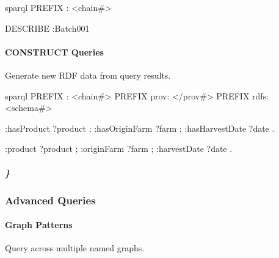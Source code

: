 \documentclass[letterpaper,10pt,english]{sphinxmanual}
\begin{document}
\sphinxAtStartPar
{}
{\color{red}\bfseries{}\textasciigrave{}\textasciigrave{}}{\color{red}\bfseries{}\textasciigrave{}}sparql
PREFIX : \textless{}\sphinxhyphen{}chain\#\textgreater{}

\sphinxAtStartPar
DESCRIBE :Batch001
{\color{red}\bfseries{}\textasciigrave{}\textasciigrave{}}{\color{red}\bfseries{}\textasciigrave{}}


\paragraph{CONSTRUCT Queries}
\label{\detokenize{api/sparql-api:construct-queries}}
\sphinxAtStartPar
Generate new RDF data from query results.

\sphinxAtStartPar
{}
{\color{red}\bfseries{}\textasciigrave{}\textasciigrave{}}{\color{red}\bfseries{}\textasciigrave{}}sparql
PREFIX : \textless{}\sphinxhyphen{}chain\#\textgreater{}
PREFIX prov: \textless{}/prov\#\textgreater{}
PREFIX rdfs: \textless{}\sphinxhyphen{}schema\#\textgreater{}
\begin{description}
\begin{description}
\sphinxAtStartPar
:hasProduct ?product ;
:hasOriginFarm ?farm ;
:hasHarvestDate ?date .

\end{description}

\begin{description}
\sphinxAtStartPar
:product ?product ;
:originFarm ?farm ;
:harvestDate ?date .

\end{description}

\end{description}


\subparagraph{\}}
\label{\detokenize{api/sparql-api:id31}}

\subsubsection{Advanced Queries}
\label{\detokenize{api/sparql-api:advanced-queries}}

\paragraph{Graph Patterns}
\label{\detokenize{api/sparql-api:graph-patterns}}
\sphinxAtStartPar
Query across multiple named graphs.
\end{document}
